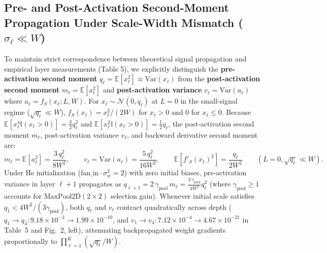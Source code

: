 \documentclass[11pt, a4paper]{article}
\begin{document}
\subsection{Pre- and Post-Activation Second-Moment Propagation Under Scale-Width Mismatch ($\sigma_{\ell} \ll W$)}
To maintain strict correspondence between theoretical signal propagation and empirical layer measurements (Table 5), we explicitly distinguish the \textbf{pre-activation second moment} $q_{\ell} = \mathbb{E}[x_{\ell}^{2}] \approx \text{Var}(x_{\ell})$ from the \textbf{post-activation second moment} $m_{\ell} = \mathbb{E}[a_{\ell}^{2}]$ and \textbf{post-activation variance} $v_{\ell} = \text{Var}(a_{\ell})$ where $a_{\ell} = f_{S}(x_{\ell}; L, W)$. For $x_{\ell} \sim \mathcal{N}(0, q_{\ell})$ at $L = 0$ in the small-signal regime ($\sqrt{q_{\ell}} \ll W$), $f_{S}(x_{\ell}) = x_{\ell}^{2}/(2W)$ for $x_{\ell} > 0$ and $0$ for $x_{\ell} \le 0$. Because $\mathbb{E}[x_{\ell}^{4}\mathbb{I}(x_{\ell}>0)] = \frac{3}{2}q_{\ell}^{2}$ and $\mathbb{E}[x_{\ell}^{2}\mathbb{I}(x_{\ell}>0)] = \frac{1}{2}q_{\ell}$, the post-activation second moment $m_{\ell}$, post-activation variance $v_{\ell}$, and backward derivative second moment are:
\begin{equation}
m_{\ell} = \mathbb{E}[a_{\ell}^{2}] = \frac{3\,q_{\ell}^{2}}{8W^{2}}, \qquad v_{\ell} = \text{Var}(a_{\ell}) = \frac{5\,q_{\ell}^{2}}{16W^{2}}, \qquad \mathbb{E}[f'_{S}(x_{\ell})^{2}] = \frac{q_{\ell}}{2W^{2}} \qquad (L = 0, \sqrt{q_{\ell}} \ll W).
\end{equation}
Under He initialization ($\text{fan\_in}\cdot\sigma_{w}^{2} = 2$) \cite{ref26} with zero initial biases, pre-activation variance in layer $\ell+1$ propagates as $q_{\ell+1} = 2\,\gamma_{\text{pool}}\,m_{\ell} = \frac{3\,\gamma_{\text{pool}}}{4W^{2}}q_{\ell}^{2}$ (where $\gamma_{\text{pool}} \ge 1$ accounts for $\text{MaxPool2D}(2\times 2)$ selection gain). Whenever initial scale satisfies $q_{1} < 4W^{2}/(3\gamma_{\text{pool}})$, both $q_{\ell}$ and $v_{\ell}$ contract quadratically across depth ($q_{1} \to q_{4}: 9.18 \times 10^{-2} \to 1.99 \times 10^{-10}$, and $v_{1} \to v_{4}: 7.12 \times 10^{-4} \to 4.67 \times 10^{-21}$ in Table~5 and Fig.~2, left), attenuating backpropagated weight gradients proportionally to $\prod_{\ell=1}^{K}(\sqrt{q_{\ell}}/W)$.
\end{document}
